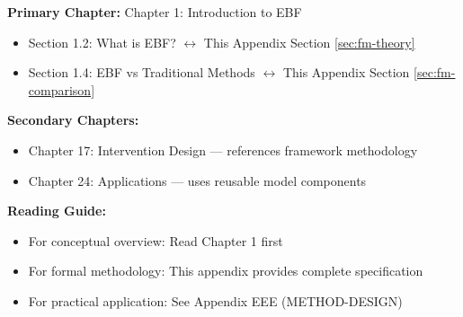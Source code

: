 %
%

%
%
%
%
%

\begin{tcolorbox}[colback=purple!5!white, colframe=purple!75!black,
    title=Chapter Linkage]

\textbf{Primary Chapter:} Chapter 1: Introduction to EBF
\begin{itemize}[nosep]
\item Section 1.2: What is EBF? $\leftrightarrow$ This Appendix Section \ref{sec:fm-theory}
\item Section 1.4: EBF vs Traditional Methods $\leftrightarrow$ This Appendix Section \ref{sec:fm-comparison}
\end{itemize}

\textbf{Secondary Chapters:}
\begin{itemize}[nosep]
\item Chapter 17: Intervention Design --- references framework methodology
\item Chapter 24: Applications --- uses reusable model components
\end{itemize}

\textbf{Reading Guide:}
\begin{itemize}[nosep]
\item For conceptual overview: Read Chapter 1 first
\item For formal methodology: This appendix provides complete specification
\item For practical application: See Appendix EEE (METHOD-DESIGN)
\end{itemize}

\end{tcolorbox}


